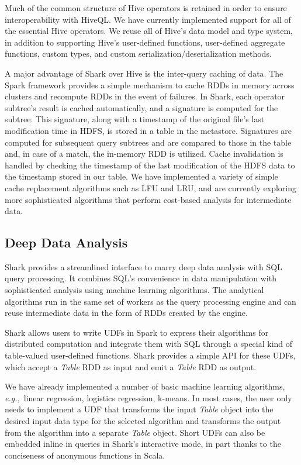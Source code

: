 \documentclass[preprint]{acm_proc_article-sp}
\newcommand{\eg}{{\em e.g.,}~}
\begin{document}
Much of the common structure of Hive operators is retained in order to ensure interoperability with HiveQL. We have currently implemented support for all of the essential Hive operators. We reuse all of Hive's data model and type system, in addition to supporting Hive's user-defined functions, user-defined aggregate functions, custom types, and custom serialization/deserialization methods.

A major advantage of Shark over Hive is the inter-query caching of data. The Spark framework provides a simple mechanism to cache RDDs in memory across clusters and recompute RDDs in the event of failures. In Shark, each operator subtree's result is cached automatically, and a signature is computed for the subtree. This signature, along with a timestamp of the original file's last modification time in HDFS, is stored in a table in the metastore. Signatures are computed for subsequent query subtrees and are compared to those in the table and, in case of a match, the in-memory RDD is utilized. Cache invalidation is handled by checking the timestamp of the last modification of the HDFS data to the timestamp stored in our table. We have implemented a variety of simple cache replacement algorithms such as LFU and LRU, and are currently exploring more sophisticated algorithms that perform cost-based analysis for intermediate data.

\subsection{Deep Data Analysis}

Shark provides a streamlined interface to marry deep data analysis with SQL query processing. It combines SQL's convenience in data manipulation with sophisticated analysis using machine learning algorithms. The analytical algorithms run in the same set of workers as the query processing engine and can reuse intermediate data in the form of RDDs created by the engine.

Shark allows users to write UDFs in Spark to express their algorithms for distributed computation and integrate them with SQL through a special kind of table-valued user-defined functions. Shark provides a simple API for these UDFs, which accept a \emph{Table} RDD as input and emit a \emph{Table} RDD as output.

We have already implemented a number of basic machine learning algorithms, \eg linear regression, logistics regression, k-means. In most cases, the user only needs to implement a UDF that transforms the input \emph{Table} object into the desired input data type for the selected algorithm and transforms the output from the algorithm into a separate \emph{Table} object. Short UDFs can also be embedded inline in queries in Shark's interactive mode, in part thanks to the conciseness of anonymous functions in Scala.
\end{document}
